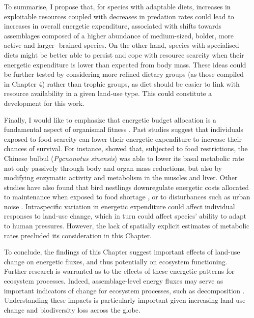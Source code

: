 To summarise, I propose that, for species with adaptable diets, increases in exploitable resources coupled with decreases in predation rates could lead to increases in overall energetic expenditure, associated with shifts towards assemblages composed of a higher abundance of medium-sized, bolder, more active and larger- brained species. On the other hand, species with specialised diets might be better able to persist and cope with resource scarcity when their energetic expenditure is lower than expected from body mass. These ideas could be further tested by considering more refined dietary groups (as those compiled in Chapter 4) rather than trophic groups, as diet should be easier to link with resource availability in a given land-use type. This could constitute a development for this work. 

Finally, I would like to emphasize that energetic budget allocation is a fundamental aspect of organismal fitness \citep{Burger2021}. Past studies suggest that individuals exposed to food scarcity can lower their energetic expenditure to increase their chances of survival. For instance, \citet{Zhang2018} showed that, subjected to food restrictions, the Chinese bulbul (\textit{Pycnonotus sinensis}) was able to lower its basal metabolic rate not only passively through body and organ mass reductions, but also by modifying enzymatic activity and metabolism in the muscles and liver. Other studies have also found that bird nestlings downregulate energetic costs allocated to maintenance when exposed to food shortage \citep{Brzek2001, Moe2004}, or to disturbances such as urban noise \citep{Brischoux2017}. Intraspecific variation in energetic expenditure could affect individual responses to land-use change, which in turn could affect species’ ability to adapt to human pressures. However, the lack of spatially explicit estimates of metabolic rates precluded its consideration in this Chapter.

To conclude, the findings of this Chapter suggest important effects of land-use change on energetic fluxes, and thus potentially on ecosystem functioning. Further research is warranted as to the effects of these energetic patterns for ecosystem processes. Indeed, assemblage-level energy fluxes may serve as important indicators of change for ecosystem processes, such as decomposition \citep{Barnes2014}. Understanding these impacts is particularly important given increasing land-use change and biodiversity loss across the globe.